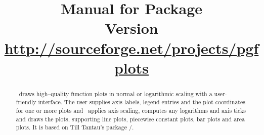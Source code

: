 %
%
%
% 
% 
%
%



\def\plotcoords{%
\addplot coordinates {
(5,8.312e-02)    (17,2.547e-02)   (49,7.407e-03)
(129,2.102e-03)  (321,5.874e-04)  (769,1.623e-04)
(1793,4.442e-05) (4097,1.207e-05) (9217,3.261e-06)
};

\addplot coordinates{
(7,8.472e-02)    (31,3.044e-02)    (111,1.022e-02)
(351,3.303e-03)  (1023,1.039e-03)  (2815,3.196e-04)
(7423,9.658e-05) (18943,2.873e-05) (47103,8.437e-06)
};

\addplot coordinates{
(9,7.881e-02)     (49,3.243e-02)    (209,1.232e-02)
(769,4.454e-03)   (2561,1.551e-03)  (7937,5.236e-04)
(23297,1.723e-04) (65537,5.545e-05) (178177,1.751e-05)
};

\addplot coordinates{
(11,6.887e-02)    (71,3.177e-02)     (351,1.341e-02)
(1471,5.334e-03)  (5503,2.027e-03)   (18943,7.415e-04)
(61183,2.628e-04) (187903,9.063e-05) (553983,3.053e-05)
};

\addplot coordinates{
(13,5.755e-02)     (97,2.925e-02)     (545,1.351e-02)
(2561,5.842e-03)   (10625,2.397e-03)  (40193,9.414e-04)
(141569,3.564e-04) (471041,1.308e-04) 
(1496065,4.670e-05)
};
}%

\title{%
	Manual for Package \PGFPlots\\
	{\small Version \pgfplotsversion}\\
	{\small\href{http://sourceforge.net/projects/pgfplots}{http://sourceforge.net/projects/pgfplots}}}


\maketitle
\begin{abstract}%
\PGFPlots\ draws high--quality function plots in normal or logarithmic scaling with a user-friendly interface. The user supplies axis labels, legend entries and the plot coordinates for one or more plots and \PGFPlots\ applies axis scaling, computes any logarithms and axis ticks and draws the plots, supporting line plots, piecewise constant plots, bar plots and area plots. It is based on Till Tantau's package \PGF/\Tikz.
\end{abstract}
\tableofcontents
